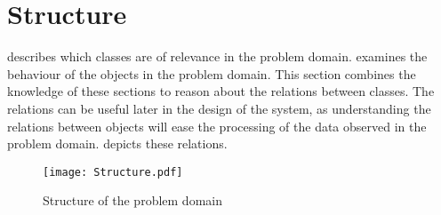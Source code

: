 \section{Structure}\label{sub:structure}

 describes which classes are of relevance in the problem domain.  examines the behaviour of the objects in the problem domain. This section combines the knowledge of these sections to reason about the relations between classes. The relations can be useful later in the design of the system, as understanding the relations between objects will ease the processing of the data observed in the problem domain.  depicts these relations.

\begin{figure}[htbp]
  \label{fig:structure}
  \centering
  \begin{adjustbox}{max width=\textwidth}
    \texttt{[image: Structure.pdf]}
  \end{adjustbox}
  \caption{Structure of the problem domain}\label{fig:structure}
\end{figure}
